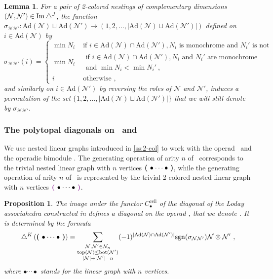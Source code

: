 \documentclass[twoside, 11pt]{amsart}
\newtheorem{proposition}[definition]{Proposition}
\newtheorem{lemma}[definition]{Lemma}
\theoremstyle{remark}
\begin{document}
\begin{lemma} 
\label{prop:signs-mul}
For a pair of 2-colored nestings of complementary dimensions $(\mathcal{N},\mathcal{N}')\in \operatorname{Im}\triangle^J$, the function $\sigma_{\mathcal{N}\mathcal{N}'}: \mathrm{Ad}(\mathcal{N})\sqcup \mathrm{Ad}(\mathcal{N}') \to (1,2,\ldots,|\mathrm{Ad}(\mathcal{N})\sqcup \mathrm{Ad}(\mathcal{N}')|)$ defined on $i \in \mathrm{Ad}(\mathcal{N})$ by
\begin{equation*}
  \sigma_{\mathcal{N}\mathcal{N}'}(i)= 
  \begin{cases}
    \min N_i & \text{ if } i \in \mathrm{Ad}(\mathcal{N})\cap \mathrm{Ad}(\mathcal{N}') , N_i \text{ is monochrome and } N_i' \text{ is not} \\
    \min N_i & \begin{array}{l}
         \text{ if } i \in \mathrm{Ad}(\mathcal{N})\cap \mathrm{Ad}(\mathcal{N}'), N_i \text{ and } N_i' \text{ are monochrome} \\
         \text{ and } \min N_i < \min N_i' \ , 
    \end{array}   \\ 
    i & \text{ otherwise ,} 
  \end{cases}
\end{equation*}
and similarly on $i \in \mathrm{Ad}(\mathcal{N}')$ by reversing the roles of $\mathcal{N}$ and $\mathcal{N}'$, induces a permutation of the set $\{1,2,\ldots,|\mathrm{Ad}(\mathcal{N})\sqcup \mathrm{Ad}(\mathcal{N}')|\}$ that we will still denote by $\sigma_{\mathcal{N}\mathcal{N}'}$.
\end{lemma}


\subsubsection{The polytopal diagonals on \Ainf\ and \Minf}
\label{ss:diagonals}

We use nested linear graphs introduced in \cref{ss:2-col} to work with the operad \Ainf\ and the operadic bimodule \Minf . The generating operation of arity $n$ of \Ainf\ corresponds to the trivial nested linear graph with $n$ vertices $\boldsymbol{\left(\right.}  \bullet \cdots \bullet  \boldsymbol{\left.\right)}$, while the generating operation of arity $n$ of \Minf\ is represented by the trivial 2-colored nested linear graph with $n$ vertices $\purple{\bullet \cdots \bullet}$.

\begin{proposition}
\label{prop:diagonal-polytopale-a-infini}
The image under the functor $C_\bullet^{\mathrm{cell}}$ of the diagonal of the Loday associahedra constructed in \cite{MTTV19} defines a diagonal on the operad \Ainf , that we denote \diagainf . It is determined by the formula 
\[ \triangle^{K} \left( \boldsymbol{\left(\right.}  \bullet \cdots \bullet  \boldsymbol{\left.\right)} \right) = 
\sum_{\substack{
  \mathcal{N},\mathcal{N}' \in \mathcal{N}_n \\ 
  \operatorname{top}(\mathcal{N}) \leq \operatorname{bot}(\mathcal{N'}) \\
  |\mathcal{N}|+|\mathcal{N}'|=n
}}
(-1)^{|\mathrm{Ad}(\mathcal{N})\cap \mathrm{Ad}(\mathcal{N}')|}\mathrm{sgn}(\sigma_{\mathcal{N}\mathcal{N}'})\mathcal{N} \otimes \mathcal{N}' \ , \] 
where $\bullet \cdots \bullet$ stands for the linear graph with $n$ vertices. 
\end{proposition}
\end{document}
